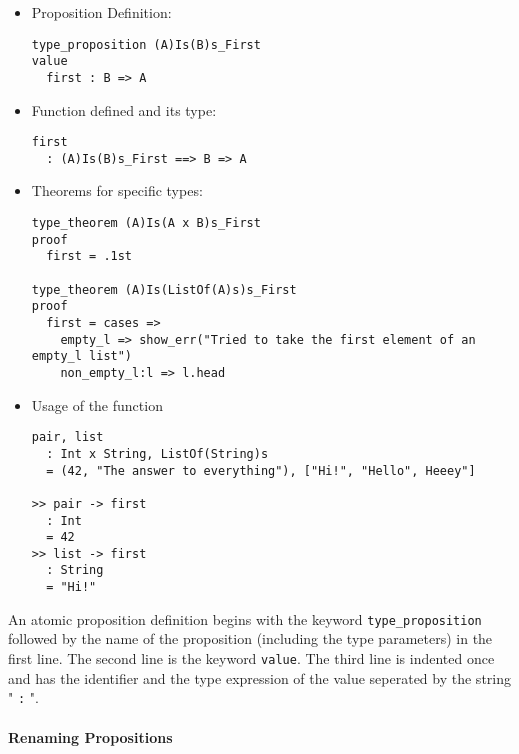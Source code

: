 \documentclass{article}
\begin{document}
\begin{itemize}
\begin{itemize}
\item Proposition Definition:

\begin{verbatim}
type_proposition (A)Is(B)s_First
value
  first : B => A
\end{verbatim}

\item Function defined and its type:

\begin{verbatim}
first
  : (A)Is(B)s_First ==> B => A
\end{verbatim}

\item Theorems for specific types:

\begin{verbatim}
type_theorem (A)Is(A x B)s_First
proof
  first = .1st

type_theorem (A)Is(ListOf(A)s)s_First
proof
  first = cases =>
    empty_l => show_err("Tried to take the first element of an empty_l list")
    non_empty_l:l => l.head
\end{verbatim}

\item Usage of the function
\begin{verbatim}
pair, list
  : Int x String, ListOf(String)s
  = (42, "The answer to everything"), ["Hi!", "Hello", Heeey"]

>> pair -> first
  : Int
  = 42
>> list -> first
  : String
  = "Hi!"
\end{verbatim}
\end{itemize}

An atomic proposition definition begins with the keyword
\texttt{type_proposition} followed by the name of the proposition (including
the type parameters) in the first line. The second line is the keyword
\texttt{value}. The third line is indented once and has the identifier and the
type expression of the value seperated by the string " \texttt{:} ".

\end{itemize}

\paragraph{Renaming Propositions}
\end{document}
